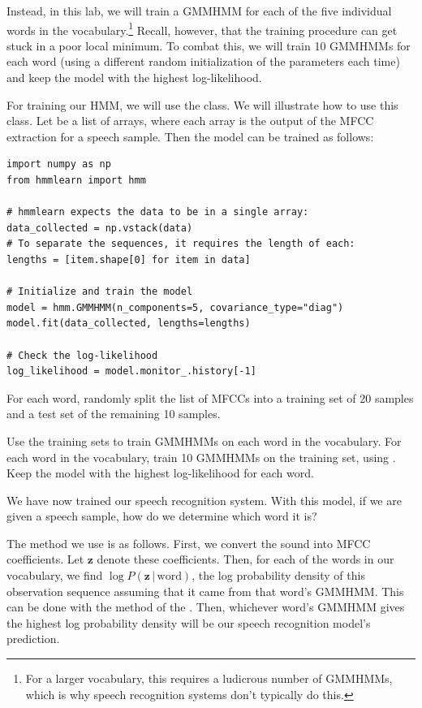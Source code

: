 Instead, in this lab, we will train a GMMHMM for each of the five individual words in the vocabulary.\footnote{For a larger vocabulary, this requires a ludicrous number of GMMHMMs, which is why speech recognition systems don't typically do this.}
Recall, however, that the training procedure can get stuck in a poor local minimum. 
To combat this, we will train 10 GMMHMMs for each word (using a different random initialization of the parameters each time)
and keep the model with the highest log-likelihood.

For training our HMM, we will use the  class.
We will illustrate how to use this class.
Let  be a list of arrays, where each array is the output of the MFCC extraction for a speech sample.
Then the model can be trained as follows:

\begin{lstlisting}
import numpy as np
from hmmlearn import hmm

# hmmlearn expects the data to be in a single array:
data_collected = np.vstack(data)
# To separate the sequences, it requires the length of each:
lengths = [item.shape[0] for item in data]

# Initialize and train the model
model = hmm.GMMHMM(n_components=5, covariance_type="diag")
model.fit(data_collected, lengths=lengths)

# Check the log-likelihood
log_likelihood = model.monitor_.history[-1]
\end{lstlisting}

\begin{problem}
For each word, randomly split the list of MFCCs into a training set of 20 samples and a test set of the remaining 10 samples.

Use the training sets to train GMMHMMs on each word in the vocabulary.
For each word in the vocabulary, train 10 GMMHMMs on the training set, using .
Keep the model with the highest log-likelihood for each word.
\end{problem}

We have now trained our speech recognition system.
With this model, if we are given a speech sample, how do we determine which word it is?

The method we use is as follows. 
First, we convert the sound into MFCC coefficients.
Let $\mathbf{z}$ denote these coefficients.
Then, for each of the words in our vocabulary, we find $\log P(\mathbf{z}\,|\,\text{word})$, the log probability density of this observation sequence assuming that it came from that word's GMMHMM.
This can be done with the  method of the .
Then, whichever word's GMMHMM gives the highest log probability density will be our speech recognition model's prediction.

